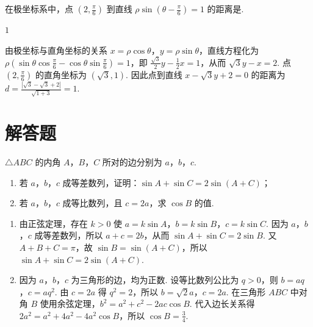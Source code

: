 \reuseproblemnumber
\begin{problem}[C]
在极坐标系中，点 \(\left(2, \frac{\pi}{6}\right)\) 到直线 \(\rho \sin \left(\theta - \frac{\pi}{6}\right) = 1\) 的距离是\fillinblank{}.
\begin{answer}
\(1\)
\end{answer}
\begin{solution}
由极坐标与直角坐标的关系 \(x=\rho\cos\theta\)，\(y=\rho\sin\theta\)，直线方程化为 \(\rho\left(\sin\theta\cos\frac\pi6-\cos\theta\sin\frac\pi6\right)=1\)，即 \(\frac{\sqrt3}{2}y-\frac12x=1\)，从而 \(\sqrt3y-x=2\).
点 \(\left(2,\frac\pi6\right)\) 的直角坐标为 \((\sqrt3,1)\). 因此点到直线 \(x-\sqrt3y+2=0\) 的距离为 \(d=\frac{|\sqrt3-\sqrt3+2|}{\sqrt{1+3}}=1\).
\end{solution}
\end{problem}

\section{解答题}

\begin{problem}
\(\triangle ABC\) 的内角 \(A\)，\(B\)，\(C\) 所对的边分别为 \(a\)，\(b\)，\(c\).

\begin{enumerate}
\item 若 \(a\)，\(b\)，\(c\) 成等差数列，证明：\(\sin A + \sin C = 2\sin (A + C)\)；
\item 若 \(a\)，\(b\)，\(c\) 成等比数列，且 \(c = 2a\)，求 \(\cos B\) 的值.
\end{enumerate}
\begin{solution}
\begin{enumerate}
\item 由正弦定理，存在 \(k>0\) 使 \(a=k\sin A\)，\(b=k\sin B\)，\(c=k\sin C\). 因为 \(a\)，\(b\)，\(c\) 成等差数列，所以 \(a+c=2b\)，从而 \(\sin A+\sin C=2\sin B\). 又 \(A+B+C=\pi\)，故 \(\sin B=\sin(A+C)\)，所以 \(\sin A+\sin C=2\sin(A+C)\).

\item 因为 \(a\)，\(b\)，\(c\) 为三角形的边，均为正数. 设等比数列公比为 \(q>0\)，则 \(b=aq\)，\(c=aq^2\). 由 \(c=2a\) 得 \(q^2=2\)，所以 \(b=\sqrt2a\)，\(c=2a\). 在三角形 \(ABC\) 中对角 \(B\) 使用余弦定理，\(b^2=a^2+c^2-2ac\cos B\). 代入边长关系得 \(2a^2=a^2+4a^2-4a^2\cos B\)，所以 \(\cos B=\frac34\).
\end{enumerate}
\end{solution}
\end{problem}

